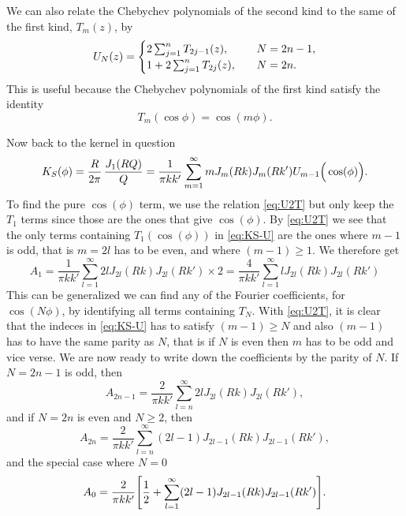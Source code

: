 \documentclass[11pt,a4paper, 
swedish, english %
]{article}
\begin{document}
We can also relate the Chebychev polynomials of the second kind to the
same of the first kind, $T_m(z)$, by
\begin{equation}\label{eq:U2T}
U_N(z) = 
\begin{cases}
2\sum_{j=1}^n T_{2j-1}(z)\qcomma&N=2n-1,\\
1+2\sum_{j=1}^n T_{2j}(z)\qcomma&N=2n.
\end{cases}
\end{equation}
This is useful because the Chebychev polynomials of the first kind
satisfy the identity \cite[chapter 18.4]{Arfken-Weber}
\begin{equation}\label{eq:Tcos}
T_m(\cos\phi) = \cos(m\phi).
\end{equation}

Now back to the kernel in question
\begin{equation}\label{eq:KS-U}
K_S(\phi) = \frac{R}{2\pi}\,\frac{J_1\qty(RQ)}{Q}
=\frac{1}{\pi kk'} \sum_{m=1}^\infty m
J_m(Rk)J_m(Rk') U_{m-1}\Big(\cos(\phi)\Big).
\end{equation}
To find the pure $\cos(\phi)$ term, we use the relation
\eqref{eq:U2T} but only keep the $T_1$ terms since those are the ones
that give $\cos(\phi)$. By \eqref{eq:U2T} we see that the
only terms containing $T_1(\cos(\phi))$ in \eqref{eq:KS-U} are
the ones where $m-1$ is odd, that is $m=2l$ has to be even, and where
$(m-1)\ge1$. We therefore get
\begin{equation}
A_1 = \frac{1}{\pi kk'} \sum_{l=1}^\infty 2l
J_{2l}(Rk)J_{2l}(Rk') \times2
=\frac{4}{\pi kk'} \sum_{l=1}^\infty l
J_{2l}(Rk)J_{2l}(Rk') 
\end{equation}
This can be generalized we can find any of the Fourier coefficients, for
$\cos(N\phi)$, by identifying all terms containing $T_N$. With
\eqref{eq:U2T}, it is clear that the indeces in \eqref{eq:KS-U} has to
satisfy $(m-1)\ge N$ and also $(m-1)$ has to have the same parity as
$N$, that is if $N$ is even then $m$ has to be odd and vice verse. We
are now ready to write down the coefficients by the parity of $N$. 
If $N=2n-1$ is odd, then
\begin{equation}
A_{2n-1} = \frac{2}{\pi kk'} 
\sum_{l=n}^\infty 2l J_{2l}(Rk)J_{2l}(Rk'),
\end{equation}
and if $N=2n$ is even and $N\ge2$, then
\begin{equation}
A_{2n} = \frac{2}{\pi kk'} 
\sum_{l=n}^\infty (2l-1) J_{2l-1}(Rk)J_{2l-1}(Rk'),
\end{equation}
and the special case where $N=0$
\begin{equation}
A_{0} = \frac{2}{\pi kk'} 
\qty[\frac{1}{2}+\sum_{l=1}^\infty (2l-1) J_{2l-1}(Rk)J_{2l-1}(Rk')].
\end{equation}
\end{document}
